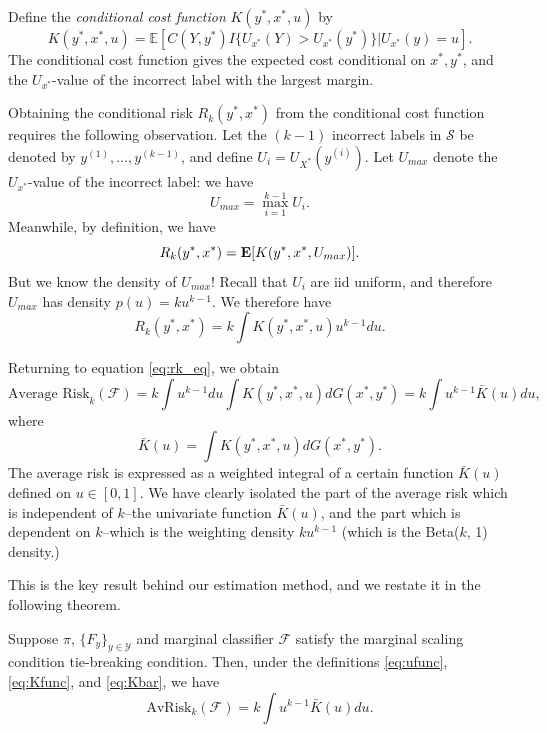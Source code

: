 \documentclass[12pt]{article}
\begin{document}
Define the \emph{conditional cost function} $K(y^*, x^*, u)$ by
\begin{equation}\label{eq:Kfunc}
K(y^*, x^*, u) = \mathbb{E}[C(Y, y^*)I\{U_{x^*}(Y) > U_{x^*}(y^*)\}|U_{x^*}(y) = u].
\end{equation}
The conditional cost function gives the expected cost conditional on
$x^*, y^*$, and the $U_{x^*}$-value of the incorrect label with the
largest margin.

Obtaining the conditional risk $R_k(y^*, x^*)$ from the conditional
cost function requires the following observation.  Let the $(k-1)$
incorrect labels in $\mathcal{S}$ be denoted by $y^{(1)},\hdots,
y^{(k-1)}$, and define $U_i = U_{X^*}(y^{(i)})$. Let $U_{max}$ denote the $U_{x^*}$-value of
the incorrect label: we have
\[
U_{max} = \max_{i=1}^{k-1} U_i.
\]
Meanwhile, by definition, we have
\[
R_k(y^*, x^*) = \textbf{E}[K(y^*, x^*, U_{max})].
\]
But we know the density of $U_{max}$!  Recall that $U_i$ are iid
uniform, and therefore $U_{max}$ has density $p(u) = ku^{k-1}$.  We
therefore have
\[
R_k(y^*, x^*) = k \int K(y^*, x^*, u) u^{k-1} du.
\]

Returning to equation \eqref{eq:rk_eq}, we obtain
\[
\text{Average Risk}_k(\mathcal{F}) = k \int u^{k-1} du \int K(y^*, x^*, u) dG(x^*, y^*) = k \int u^{k-1} \bar{K}(u) du,
\]
where
\begin{equation}\label{eq:Kbar}
\bar{K}(u) = \int K(y^*, x^*, u) dG(x^*, y^*).
\end{equation}
The average risk is expressed as a weighted integral of a certain
function $\bar{K}(u)$ defined on $u \in [0,1]$.  We have clearly
isolated the part of the average risk which is independent of $k$--the
univariate function $\bar{K}(u)$, and the part which is dependent on
$k$--which is the weighting density $ku^{k-1}$ (which is the
Beta($k$, 1) density.)

This is the key result behind our estimation method, and we restate it
in the following theorem.

\begin{theorem}
Suppose $\pi$, $\{F_y\}_{y \in \mathcal{Y}}$ and marginal classifier
$\mathcal{F}$ satisfy the marginal scaling condition tie-breaking
condition.  Then, under the definitions \eqref{eq:ufunc}, \eqref{eq:Kfunc}, and \eqref{eq:Kbar}, we have
\begin{equation}\label{eq:avrisk_identity}
\text{AvRisk}_k(\mathcal{F}) = k \int u^{k-1} \bar{K}(u) du.
\end{equation}
\end{theorem}
\end{document}
